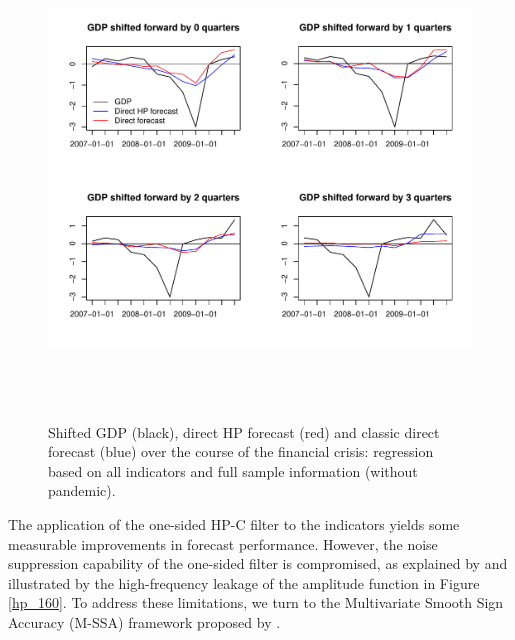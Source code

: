 \documentclass[11pt,a4paper]{article}
\begin{document}
\begin{figure}[H]
    \begin{center}
        \includegraphics[height=5in, width=6in]{./Figures/direct_hp_forecasts_financial_crisis.pdf}
        \caption{Shifted GDP (black), direct HP forecast (red) and classic direct forecast (blue) over the course of the financial crisis: regression based on all indicators and full sample information (without pandemic).
        \label{direct_hp_forecasts_financial_crisis}}
    \end{center}
\end{figure}



The application of the one-sided HP-C filter to the indicators yields some measurable improvements in forecast performance. However, 
the noise suppression capability of the one-sided filter is compromised, as explained by \cite{Wildi2025} and illustrated by the high-frequency leakage of the amplitude function in Figure \ref{hp_160}. To address these limitations, we turn to the Multivariate Smooth Sign Accuracy (M-SSA) framework proposed by \cite{Wildi2025}.
\end{document}
